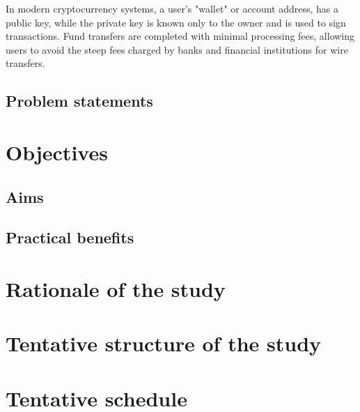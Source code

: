 In modern cryptocurrency systems, a user's "wallet" or account address, has a public key, while the private key is known only to the owner and is used to sign transactions. Fund transfers are completed with minimal processing fees, allowing users to avoid the steep fees charged by banks and financial institutions for wire transfers.



\subsection{Problem statements}




\section{Objectives}

\subsection{Aims}


\subsection{Practical benefits}




\section{Rationale of the study}

\section{Tentative structure of the study}

\section{Tentative schedule}